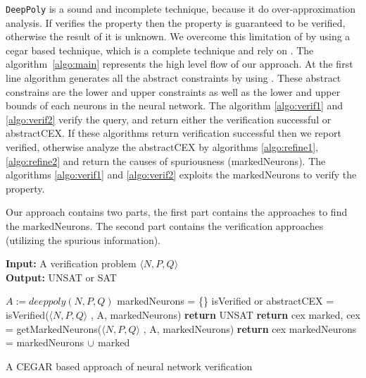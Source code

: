\texttt{DeepPoly} is a sound and incomplete technique, because it do over-approximation analysis. 
If \deeppoly{} verifies the property then the property is guaranteed to be verified, otherwise the result of it is unknown. 
We overcome this limitation of \deeppoly{} by using a cegar based technique, which is a complete technique and rely on \deeppoly{}. 
The algorithm~\ref{algo:main} represents the high level flow of our approach.
At the first line algorithm generates all the abstract constraints by using \deeppoly{}. 
These abstract constrains are the lower and upper constraints as well as the lower and upper bounds 
of each neurons in the neural network. The algorithm \ref{algo:verif1} and \ref{algo:verif2} verify the query, 
and return either the verification successful or abstractCEX. If these algorithms return verification successful then we report verified,
otherwise analyze the abstractCEX by algorithms \ref{algo:refine1}, \ref{algo:refine2} and return the causes of spuriousness (markedNeurons). 
The algorithms \ref{algo:verif1} and \ref{algo:verif2} exploits the markedNeurons to verify the property. 

Our approach contains two parts, the first part contains the approaches to find the markedNeurons. 
The second part contains the verification approaches (utilizing the spurious information).

\begin{algorithm}[t]
  \textbf{Input: } A verification problem $\langle N,P,Q \rangle$ \\
  \textbf{Output: } UNSAT or SAT
  \begin{algorithmic}[1]
    \State $A := deeppoly(N,P,Q)$
    \State markedNeurons = \{\}
      \State isVerified or abstractCEX = isVerified($\langle N,P,Q \rangle$ , A, markedNeurons)
        \State \textbf{return} UNSAT
      \Else
          \State \textbf{return} cex
        \Else
          \State marked, cex = getMarkedNeurons($\langle N,P,Q \rangle$ , A, markedNeurons)
            \State \textbf{return} cex
          \EndIf
          \State markedNeurons = markedNeurons ${\cup}$ marked
        \EndIf
      \EndIf
    \EndWhile
  \end{algorithmic}
  \caption{A CEGAR based approach of neural network verification}
  \label{algo:main}
\end{algorithm}


